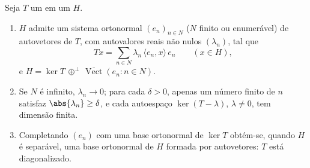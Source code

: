 \begin{theorem}\label{thm:b3:spectral:spectral}
Seja $T$ um   em um 
$H$.
\begin{enumerate}
  \item $H$ admite um sistema ortonormal $(e_n)_{n \in N}$ ($N$ finito ou
        enumerável) de autovetores de $T$, com autovalores reais não
        nulos $(\lambda_n)$, tal que
        \[
        Tx = \sum_{n\in N}\lambda_n\,\langle e_n, x\rangle\,
        e_n \qquad (x \in H),
        \]
        e $H = \ker T \,\oplus^\perp\,
        \overline{\operatorname{Vect}}(e_n : n \in N)$.
  \item Se $N$ é infinito, $\lambda_n \to 0$; para cada $\delta > 0$, apenas um número
        finito de $n$ satisfaz $\abs{\lambda_n} \geq \delta$, e cada autoespaço $\ker(T - \lambda)$, $\lambda \neq 0$,
        tem dimensão finita.
  \item Completando $(e_n)$ com uma base ortonormal de $\ker T$
        obtém-se, quando $H$ é separável, uma base ortonormal de
        $H$ formada por autovetores: $T$ está diagonalizado.
\end{enumerate}
\end{theorem}

